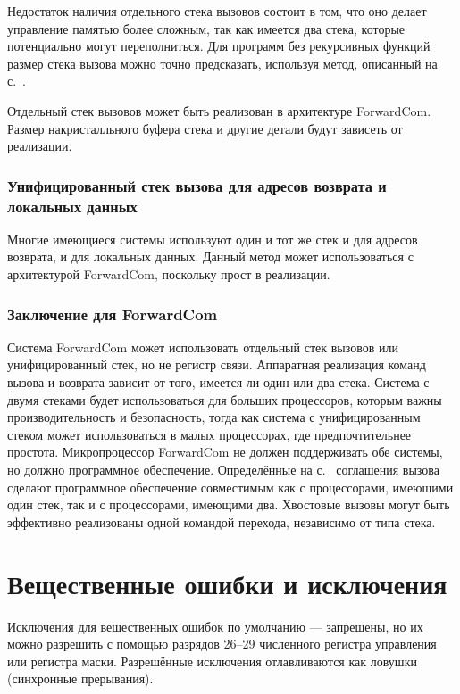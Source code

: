 \documentclass[forwardcom.tex]{subfiles}
\begin{document}
Недостаток наличия отдельного стека вызовов состоит в том, что оно делает управление памятью более сложным, так как имеется два стека, которые потенциально могут переполниться. Для программ без рекурсивных функций размер стека вызова можно точно предсказать, используя метод, описанный на с.~\pageref{predictingStackSize}.

Отдельный стек вызовов может быть реализован в архитектуре ForwardCom. Размер накристалльного буфера стека и другие детали будут зависеть от реализации.

\subsubsection{Унифицированный стек вызова для адресов возврата и локальных данных} \label{singleStack}
Многие имеющиеся системы используют один и тот же стек и для адресов возврата, и для локальных данных. Данный метод может использоваться с архитектурой ForwardCom, поскольку прост в реализации. 

\subsubsection{Заключение для ForwardCom}
Система ForwardCom может использовать отдельный стек вызовов или унифицированный стек, но не регистр связи. Аппаратная реализация команд вызова и возврата зависит от того, имеется ли один или два стека. Система с двумя стеками будет использоваться для больших процессоров, которым важны производительность и безопасность, тогда как система с унифицированным стеком может использоваться в малых процессорах, где предпочтительнее простота. Микропроцессор ForwardCom не должен поддерживать обе системы, но должно программное обеспечение. Определённые на с.~\pageref{functionCallingConventions} соглашения вызова сделают программное обеспечение совместимым как с процессорами, имеющими один стек, так и с процессорами, имеющими два. Хвостовые вызовы могут быть эффективно реализованы одной командой перехода, независимо от типа стека.

\section{Вещественные ошибки и исключения}
Исключения  для вещественных ошибок по умолчанию --- запрещены, но их можно разрешить с помощью разрядов 26--29 численного регистра управления или регистра маски. Разрешённые исключения отлавливаются как ловушки (синхронные прерывания).
\end{document}
